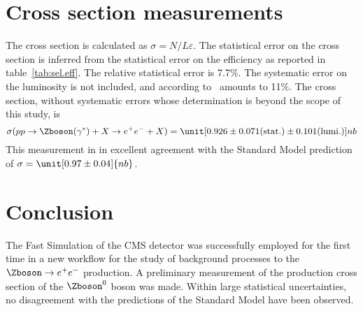 \section{Cross section measurements}
The cross section is calculated as $\sigma = N / L\varepsilon$. The
statistical error on the cross section is inferred from the statistical
error on the efficiency as reported in table~\ref{tab:sel.eff}. The relative
statistical error is 7.7\%. The systematic error on the luminosity is not
included, and according to~\cite{ewk:luminosity.uncertainty} amounts to
11\%. The cross section, without systematic errors whose determination is beyond the scope of this study, is
\begin{equation*}
    \sigma(pp\rightarrow \Zboson(\gamma^*) + X \rightarrow e^+e^- + X) = \unit[0.926\pm0.071\text{(stat.)}\pm0.101\text{(lumi.)}]{nb}
\end{equation*}
This measurement in in excellent agreement with the Standard Model prediction of $\sigma = \unit[0.97\pm0.04]{nb}$.
\section{Conclusion}
The Fast Simulation of the CMS detector was successfully employed for the first time in a new workflow for the study of background processes to the $\Zboson \rightarrow e^+e^-$ production. A preliminary measurement of the production cross section of the $\Zboson^0$ boson was made. Within large statistical uncertainties, no disagreement with the predictions of the Standard Model have been observed. 


